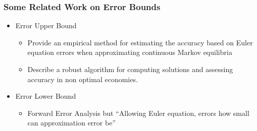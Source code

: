 \documentclass[notheorems]{beamer}
\begin{document}
\begin{frame}
\end{frame}



\begin{frame}
\end{frame}




\begin{frame}
\end{frame}



\begin{frame}
\end{frame}




\begin{frame}
\end{frame}


\begin{frame}
\end{frame}


\begin{frame}
\end{frame}


\begin{frame}
\end{frame}




\begin{frame}
  \frametitle{Some Related Work on Error Bounds}
  \begin{itemize}
  \item \cite{peralta-alva14} Error Upper Bound
    \begin{itemize}
\item Provide an empirical method for estimating the accuracy based on Euler equation errors when approximating continuous Markov equilibria
    \item Describe a robust algorithm for computing solutions and assessing accuracy in non optimal economies.\cite{feng14:_num}
    \end{itemize}
  \item \cite{judd2017lower} Error Lower Bound
    \begin{itemize}
    \item Forward Error Analysis but ``Allowing Euler equation, errors how small can approximation error be''
    \end{itemize}
  \end{itemize}
\end{frame}
\end{document}
